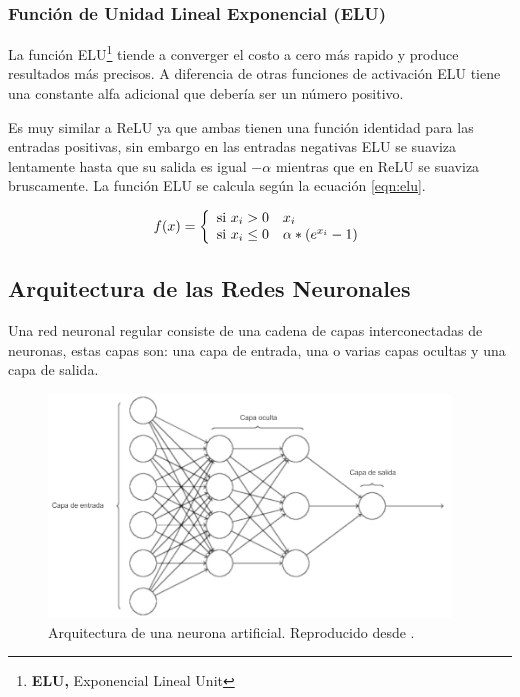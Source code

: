 \subsubsection{Funci\'{o}n de Unidad Lineal Exponencial (ELU)}

La funci\'{o}n ELU\footnote{\textbf{ELU, }Exponencial Lineal Unit} tiende a converger el costo a cero m\'{a}s rapido y produce resultados m\'{a}s precisos. A diferencia de otras funciones de activaci\'{o}n ELU tiene una constante alfa adicional que deber\'{i}a ser un n\'{u}mero positivo.

\vspace{5mm} %

Es muy similar a ReLU ya que ambas tienen una funci\'{o}n identidad para las entradas positivas, sin embargo en las entradas negativas ELU se suaviza lentamente hasta que su salida es igual $-\alpha$ mientras que en ReLU se suaviza bruscamente. La funci\'{o}n ELU se calcula seg\'{u}n la ecuaci\'{o}n \ref{eqn:elu}.

\begin{equation}
f(x) = \left\lbrace
\begin{array}{ll}
\textup{si } x_{i}>0 & x_{i}\\
\textup{si } x_{i} \leq 0 & \alpha *( e^{x_{i}}-1)
\end{array}
\right.
\label{eqn:elu}
\end{equation}

\subsection{Arquitectura de las Redes Neuronales}

Una red neuronal regular consiste de una cadena de capas interconectadas de neuronas, estas capas son: una capa de entrada, una o varias capas ocultas y una capa de salida. 

\begin{figure}[h!]
  \begin{center}	\includegraphics[width=0.95\textwidth, frame]{imagenes/Cap4/arquitectura}
  \caption{Arquitectura de una neurona artificial. Reproducido desde \protect\cite{Reference70}.}
  \label{fig:arquitectura}
  \end{center}
\end{figure}

